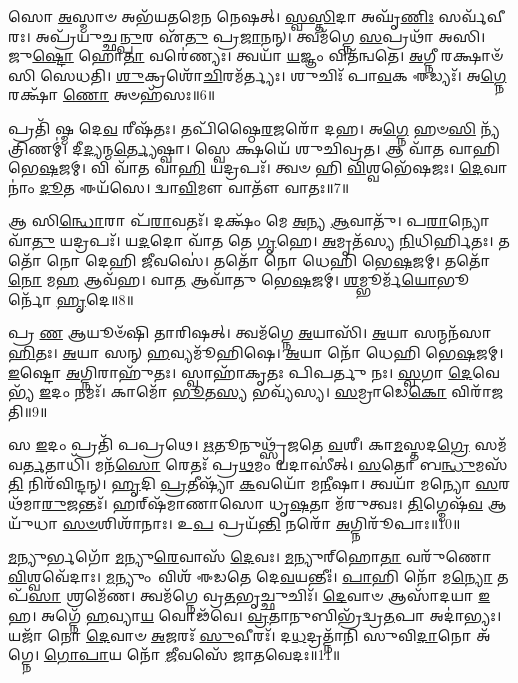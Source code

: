 𑌸𑍋 \ul{𑌅}\-𑌸𑍍𑌮𑌾𑍞 𑌅𑌭᳴𑌯𑌤𑌮𑍇𑌨 𑌨𑍇𑌷𑌤𑍍।
\-\ul{𑌸𑍍𑌵}\-\-\ul{𑌸𑍍𑌤𑌿}\-𑌦𑌾 𑌅𑌘𑍃᳴\-\ul{𑌣𑌿𑌃} 𑌸𑌰𑍍𑌵᳴𑌵𑍀𑌰𑌃।
𑌅𑌪𑍍𑌰᳴𑌯𑍁𑌚𑍍𑌛\-\ul{𑌨𑍍𑌪𑍁}\-𑌰 𑌏᳴\-\ul{𑌤𑍁} 𑌪𑍍𑌰\-\ul{𑌜𑌾}\-𑌨𑌨𑍍।
𑌤𑍍𑌵𑌮᳴𑌗𑍍𑌨𑍇 \ul{𑌸}\-𑌪𑍍𑌰𑌥𑌾᳴ 𑌅𑌸𑌿।
𑌜𑍁\-\ul{𑌷𑍍𑌟𑍋} 𑌹𑍋\-\ul{𑌤𑌾} 𑌵𑌰𑍇॑𑌣𑍍𑌯𑌃।
𑌤𑍍𑌵𑌯𑌾᳴ \ul{𑌯}\-𑌜𑍍𑌞𑌂 𑌵𑌿𑌤᳴𑌨𑍍𑌵𑌤𑍇।
\-\ul{𑌅}\-𑌗𑍍𑌨𑍀 𑌰𑌕𑍍𑌷𑌾𑍞᳴𑌸𑌿 𑌸𑍇𑌧𑌤𑌿।
\-\ul{𑌶𑍁}\-𑌕𑍍𑌰𑌶𑍋᳴\-\ul{𑌚𑌿}\-𑌰𑌮᳴𑌰𑍍𑌤𑍍𑌯𑌃।
𑌶𑍁𑌚𑌿𑌃᳴ 𑌪𑌾\-\ul{𑌵}\-𑌕 𑌈𑌡𑍍𑌯𑌃᳴।
𑌅\-\ul{𑌗𑍍𑌨𑍇} 𑌰𑌕𑍍𑌷𑌾᳴ \ul{𑌣𑍋} 𑌅𑍞𑌹᳴𑌸𑌃॥6॥

𑌪𑍍𑌰𑌤𑌿᳴ 𑌷𑍍𑌮 𑌦𑍇\-\ul{𑌵} 𑌰𑍀𑌷᳴𑌤𑌃।
𑌤𑌪𑌿᳴𑌷𑍍𑌠𑍈\-\ul{𑌰}\-𑌜𑌰𑍋᳴ 𑌦𑌹।
𑌅\-\ul{𑌗𑍍𑌨𑍇} 𑌹𑍞\-\ul{𑌸𑌿} 𑌨𑍍𑌯᳴𑌤𑍍𑌰𑌿𑌣𑌮𑍍॑।
𑌦𑍀\-\ul{𑌦𑍍𑌯}\-𑌨𑍍𑌮\-\ul{𑌰𑍍𑌤𑍍𑌯𑍇}\-𑌷𑍍𑌵𑌾।
𑌸𑍍𑌵𑍇 𑌕𑍍𑌷𑌯𑍇᳴ 𑌶𑍁𑌚𑌿𑌵𑍍𑌰𑌤।
𑌆 𑌵𑌾᳴𑌤 𑌵𑌾𑌹𑌿 𑌭𑍇\-\ul{𑌷}\-𑌜𑌮𑍍।
𑌵𑌿 𑌵𑌾᳴𑌤 𑌵𑌾\-\ul{𑌹𑌿} 𑌯𑌦𑍍𑌰𑌪𑌃᳴।
𑌤𑍍𑌵𑍞 𑌹𑌿 \ul{𑌵𑌿}\-𑌶𑍍𑌵𑌭𑍇᳴𑌷𑌜𑌃।
\-\ul{𑌦𑍇}\-𑌵𑌾𑌨𑌾𑌂॑ \ul{𑌦𑍂}\-𑌤 𑌈𑌯᳴𑌸𑍇।
𑌦𑍍𑌵𑌾\-\ul{𑌵𑌿}\-𑌮𑍗 𑌵𑌾𑌤𑍗᳴ 𑌵𑌾𑌤𑌃॥7॥

𑌆 𑌸𑌿\-\ul{𑌨𑍍𑌧𑍋}\-𑌰𑌾 𑌪᳴\-\ul{𑌰𑌾}\-𑌵𑌤𑌃᳴।
𑌦𑌕𑍍𑌷𑌂᳴ 𑌮𑍇 \ul{𑌅}\-𑌨𑍍𑌯 \ul{𑌆}\-𑌵𑌾𑌤𑍁᳴।
𑌪\-\ul{𑌰𑌾}\-𑌨𑍍𑌯𑍋 𑌵𑌾᳴\-\ul{𑌤𑍁} 𑌯𑌦𑍍𑌰𑌪𑌃᳴।
𑌯\-\ul{𑌦}\-𑌦𑍋 𑌵𑌾᳴𑌤 𑌤𑍇 \ul{𑌗𑍃}\-𑌹𑍇।
\-\ul{𑌅}\-𑌮𑍃𑌤᳴𑌸𑍍𑌯 \ul{𑌨𑌿}\-𑌧𑌿𑌰𑍍\mbox{}\-\ul{𑌹𑌿}\-𑌤𑌃।
𑌤𑌤𑍋᳴ 𑌨𑍋 𑌦𑍇𑌹𑌿 \ul{𑌜𑍀}\-𑌵𑌸𑍇॑।
𑌤𑌤𑍋᳴ 𑌨𑍋 𑌧𑍇𑌹𑌿 𑌭𑍇\-\ul{𑌷}\-𑌜𑌮𑍍।
𑌤𑌤𑍋᳴ \ul{𑌨𑍋} 𑌮\-\ul{𑌹} 𑌆𑌵᳴𑌹।
𑌵𑌾\-\ul{𑌤} 𑌆𑌵𑌾᳴𑌤𑍁 𑌭𑍇\-\ul{𑌷}\-𑌜𑌮𑍍।
\-\ul{𑌶}\-𑌮𑍍𑌭𑍂𑌰𑍍𑌮᳴\-\ul{𑌯𑍋}\-𑌭𑍂𑌰𑍍𑌨𑍋᳴ \ul{𑌹𑍃}\-𑌦𑍇॥8॥

𑌪𑍍𑌰 \ul{𑌣} 𑌆𑌯𑍂𑍞᳴𑌷𑌿 𑌤𑌾𑌰𑌿𑌷𑌤𑍍।
𑌤𑍍𑌵𑌮᳴𑌗𑍍𑌨𑍇 \ul{𑌅}\-𑌯𑌾𑌸𑌿᳴।
\-\ul{𑌅}\-𑌯𑌾 𑌸𑌨𑍍𑌮𑌨᳴𑌸𑌾 \ul{𑌹𑌿}\-𑌤𑌃।
\-\ul{𑌅}\-𑌯𑌾 𑌸𑌨𑍍 \ul{𑌹}\-𑌵𑍍𑌯𑌮𑍂᳴𑌹𑌿𑌷𑍇।
\-\ul{𑌅}\-𑌯𑌾 𑌨𑍋᳴ 𑌧𑍇𑌹𑌿 𑌭𑍇\-\ul{𑌷}\-𑌜𑌮𑍍।
\-\ul{𑌇}\-𑌷𑍍𑌟𑍋 \ul{𑌅}\-𑌗𑍍𑌨𑌿𑌰𑌾𑌹𑍁᳴𑌤𑌃।
𑌸𑍍𑌵𑌾𑌹𑌾᳴𑌕𑍃𑌤𑌃 𑌪𑌿𑌪𑌰𑍍𑌤𑍁 𑌨𑌃।
\-\ul{𑌸𑍍𑌵}\-𑌗𑌾 \ul{𑌦𑍇}\-𑌵𑍇𑌭𑍍𑌯᳴ \ul{𑌇}\-𑌦𑌂 𑌨𑌮𑌃᳴।
𑌕𑌾𑌮𑍋᳴ \ul{𑌭𑍂}\-𑌤\-\ul{𑌸𑍍𑌯} 𑌭𑌵𑍍𑌯᳴𑌸𑍍𑌯।
\-\ul{𑌸}\-𑌮𑍍𑌰𑌾𑌡𑍇\-\ul{𑌕𑍋} 𑌵𑌿𑌰𑌾᳴𑌜𑌤𑌿॥9॥

𑌸 \ul{𑌇}\-𑌦𑌂 𑌪𑍍𑌰𑌤𑌿᳴ 𑌪𑌪𑍍𑌰𑌥𑍇।
\-\ul{𑌋}\-𑌤𑍂𑌨𑍁𑌥𑍍𑌸𑍃᳴𑌜𑌤𑍇 \ul{𑌵}\-𑌶𑍀।
𑌕𑌾\-\ul{𑌮}\-𑌸𑍍𑌤𑌦\-\ul{𑌗𑍍𑌰𑍇} 𑌸𑌮᳴𑌵\-\ul{𑌰𑍍𑌤}\-𑌤𑌾𑌧𑌿᳴।
𑌮𑌨᳴\-\ul{𑌸𑍋} 𑌰𑍇𑌤𑌃᳴ 𑌪𑍍𑌰\-\ul{𑌥}\-𑌮𑌂 𑌯𑌦𑌾𑌸𑍀॑𑌤𑍍।
\-\ul{𑌸}\-𑌤𑍋 𑌬\-\ul{𑌨𑍍𑌧𑍁}\-𑌮𑌸᳴\-\ul{𑌤𑌿} 𑌨𑌿𑌰᳴𑌵𑌿𑌨𑍍𑌦𑌨𑍍।
\-\ul{𑌹𑍃}\-𑌦𑌿 \ul{𑌪𑍍𑌰}\-𑌤𑍀𑌷𑍍𑌯𑌾᳴ \ul{𑌕}\-𑌵𑌯𑍋᳴ 𑌮\-\ul{𑌨𑍀}\-𑌷𑌾।
𑌤𑍍𑌵𑌯𑌾᳴ 𑌮𑌨𑍍𑌯𑍋 \ul{𑌸}\-𑌰𑌥᳴𑌮𑌾\-\ul{𑌰𑍁}\-𑌜𑌨𑍍𑌤𑌃᳴।
𑌹𑌰𑍍‌\mbox{}𑌷᳴𑌮𑌾𑌣𑌾𑌸𑍋 𑌧𑍃\-\ul{𑌷}\-𑌤𑌾 𑌮᳴𑌰𑍁𑌤𑍍𑌵𑌃।
\-\ul{𑌤𑌿}\-𑌗𑍍𑌮𑍇𑌷᳴\-\ul{𑌵} 𑌆𑌯𑍁᳴𑌧𑌾 \ul{𑌸}\-\-\ul{𑍞}\-𑌶𑌿𑌶𑌾᳴𑌨𑌾𑌃।
𑌉\-\ul{𑌪} 𑌪𑍍𑌰𑌯᳴\-\ul{𑌨𑍍𑌤𑌿} 𑌨𑌰𑍋᳴ \ul{𑌅}\-𑌗𑍍𑌨𑌿𑌰𑍂᳴𑌪𑌾𑌃॥10॥

\-\ul{𑌮}\-𑌨𑍍𑌯𑍁𑌰𑍍𑌭𑌗𑍋᳴ \ul{𑌮}\-𑌨𑍍𑌯𑍁\-\ul{𑌰𑍇}\-𑌵𑌾𑌸᳴ \ul{𑌦𑍇}\-𑌵𑌃।
\-\ul{𑌮}\-𑌨𑍍𑌯𑍁𑌰𑍍‌\mbox{}𑌹𑍋\-\ul{𑌤𑌾} 𑌵𑌰𑍁᳴𑌣𑍋 \ul{𑌵𑌿}\-𑌶𑍍𑌵𑌵𑍇᳴𑌦𑌾𑌃।
\-\ul{𑌮}\-𑌨𑍍𑌯𑍁𑌂 𑌵𑌿𑌶᳴ 𑌈𑌡𑌤𑍇 𑌦𑍇\-\ul{𑌵}\-𑌯𑌨𑍍𑌤𑍀𑌃॑।
\-\ul{𑌪𑌾}\-𑌹𑌿 𑌨𑍋᳴ 𑌮\-\ul{𑌨𑍍𑌯𑍋} 𑌤𑌪᳴\-\ul{𑌸𑌾} 𑌶𑍍𑌰𑌮𑍇᳴𑌣।
𑌤𑍍𑌵𑌮᳴𑌗𑍍𑌨𑍇 𑌵𑍍𑌰\-\ul{𑌤}\-𑌭𑍃𑌚𑍍𑌛𑍁𑌚𑌿𑌃᳴।
\-\ul{𑌦𑍇}\-𑌵𑌾𑍞 𑌆𑌸𑌾᳴𑌦𑌯𑌾 \ul{𑌇}\-𑌹।
𑌅𑌗𑍍𑌨𑍇᳴ \ul{𑌹}\-𑌵𑍍𑌯𑌾\-\ul{𑌯} 𑌵𑍋𑌢᳴𑌵𑍇।
\-\ul{𑌵𑍍𑌰}\-𑌤𑌾𑌨𑍁𑌬𑌿𑌭𑍍𑌰᳴𑌦𑍍𑌵𑍍𑌰\-\ul{𑌤}\-𑌪𑌾 𑌅𑌦𑌾॑𑌭𑍍𑌯𑌃।
𑌯𑌜𑌾᳴ 𑌨𑍋 \ul{𑌦𑍇}\-𑌵𑌾𑍞 \ul{𑌅}\-𑌜𑌰𑌃᳴ \ul{𑌸𑍁}\-𑌵𑍀𑌰𑌃᳴।
𑌦\-\ul{𑌧}\-𑌦𑍍𑌰𑌤𑍍𑌨𑌾᳴𑌨𑌿 𑌸𑍁𑌵𑌿\-\ul{𑌦𑌾}\-𑌨𑍋 𑌅᳴𑌗𑍍𑌨𑍇।
\-\ul{𑌗𑍋}\-\-\ul{𑌪𑌾}\-𑌯 𑌨𑍋᳴ \ul{𑌜𑍀}\-𑌵𑌸𑍇᳴ 𑌜𑌾𑌤𑌵𑍇𑌦𑌃॥11॥\anuvakamend[𑌜𑌿𑌘𑌾𑍞᳴𑌸\-\ul{𑌤𑍍𑌯}\-𑌮𑌿𑌤𑍍𑌰𑌾॑𑌞𑍍𑌜\-\ul{𑌘}\-𑌨𑍍𑌵𑌾𑌨𑍀᳴𑌡\-\ul{𑌤𑍇} 𑌸\-\ul{𑌰𑍍𑌵𑌾} 𑌅𑍞𑌹᳴𑌸𑍋 𑌵𑌾𑌤𑍋 \ul{𑌹𑍃}\-𑌦𑍇 𑌰𑌾᳴𑌜\-\ul{𑌤𑍍𑌯}\-𑌗𑍍𑌨𑌿𑌰𑍂᳴𑌪𑌾𑌃 𑌸𑍁𑌵𑌿\-\ul{𑌦𑌾}\-𑌨𑍋 𑌅᳴\-\ul{𑌗𑍍𑌨} 𑌏𑌕𑌂᳴ 𑌚]

